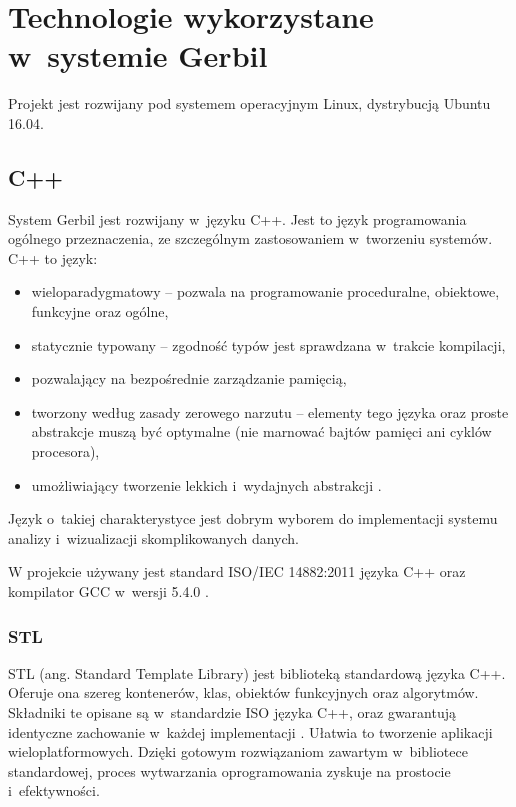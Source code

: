 \chapter{Technologie wykorzystane w~systemie Gerbil}

Projekt jest rozwijany pod systemem operacyjnym Linux, dystrybucją Ubuntu 16.04.

 \section{C++}
System Gerbil jest rozwijany w~języku C++. Jest to język programowania ogólnego przeznaczenia, ze szczególnym zastosowaniem w~tworzeniu systemów. C++ to język: 
\begin{itemize}
	\item wieloparadygmatowy -- pozwala na programowanie proceduralne, obiektowe, funkcyjne oraz ogólne,
	\item statycznie typowany -- zgodność typów jest sprawdzana w~trakcie kompilacji,
	\item pozwalający na bezpośrednie zarządzanie pamięcią,
	\item tworzony według zasady zerowego narzutu -- elementy tego języka oraz proste abstrakcje muszą być optymalne (nie marnować bajtów pamięci ani cyklów procesora),
	\item umożliwiający tworzenie lekkich i~wydajnych abstrakcji \cite{Stroustrup}\cite{cplusplus}.
\end{itemize}

Język o~takiej charakterystyce jest dobrym wyborem do implementacji systemu analizy i~wizualizacji skomplikowanych danych.

W projekcie używany jest standard ISO/IEC 14882:2011 języka C++ oraz kompilator GCC w~wersji 5.4.0 \cite{C++11}.

 \subsection{STL}
STL (ang. Standard Template Library) jest biblioteką standardową języka C++. Oferuje ona szereg kontenerów, klas, obiektów funkcyjnych oraz algorytmów. Składniki te opisane są w~standardzie ISO języka C++, oraz gwarantują identyczne zachowanie w~każdej implementacji \cite{Stroustrup}. Ułatwia to tworzenie aplikacji wieloplatformowych. Dzięki gotowym rozwiązaniom zawartym w~bibliotece standardowej, proces wytwarzania oprogramowania zyskuje na prostocie i~efektywności. 

